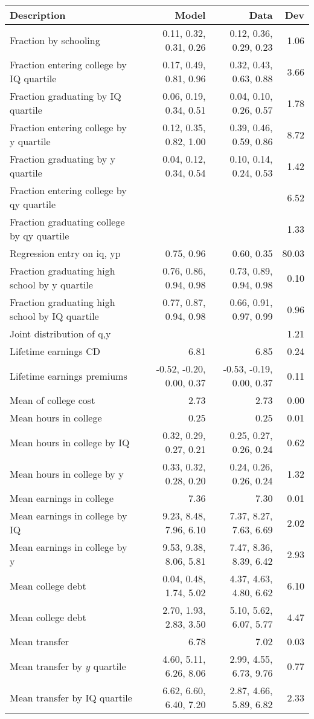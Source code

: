 \begin{tabular}{lrrr}
\hline
Description & Model  & Data  & Dev  \\ 
\hline
Fraction by schooling & 0.11, 0.32, 0.31, 0.26  & 0.12, 0.36, 0.29, 0.23  & 1.06  \\ 
Fraction entering college by IQ quartile & 0.17, 0.49, 0.81, 0.96  & 0.32, 0.43, 0.63, 0.88  & 3.66  \\ 
Fraction graduating by IQ quartile & 0.06, 0.19, 0.34, 0.51  & 0.04, 0.10, 0.26, 0.57  & 1.78  \\ 
Fraction entering college by y quartile & 0.12, 0.35, 0.82, 1.00  & 0.39, 0.46, 0.59, 0.86  & 8.72  \\ 
Fraction graduating by y quartile & 0.04, 0.12, 0.34, 0.54  & 0.10, 0.14, 0.24, 0.53  & 1.42  \\ 
Fraction entering college by qy quartile &   &   & 6.52  \\ 
Fraction graduating college by qy quartile &   &   & 1.33  \\ 
Regression entry on iq, yp & 0.75, 0.96  & 0.60, 0.35  & 80.03  \\ 
Fraction graduating high school by y quartile & 0.76, 0.86, 0.94, 0.98  & 0.73, 0.89, 0.94, 0.98  & 0.10  \\ 
Fraction graduating high school by IQ quartile & 0.77, 0.87, 0.94, 0.98  & 0.66, 0.91, 0.97, 0.99  & 0.96  \\ 
Joint distribution of q,y &   &   & 1.21  \\ 
Lifetime earnings CD & 6.81  & 6.85  & 0.24  \\ 
Lifetime earnings premiums & -0.52, -0.20, 0.00, 0.37  & -0.53, -0.19, 0.00, 0.37  & 0.11  \\ 
Mean of college cost & 2.73  & 2.73  & 0.00  \\ 
Mean hours in college & 0.25  & 0.25  & 0.01  \\ 
Mean hours in college by IQ & 0.32, 0.29, 0.27, 0.21  & 0.25, 0.27, 0.26, 0.24  & 0.62  \\ 
Mean hours in college by y & 0.33, 0.32, 0.28, 0.20  & 0.24, 0.26, 0.26, 0.24  & 1.32  \\ 
Mean earnings in college & 7.36  & 7.30  & 0.01  \\ 
Mean earnings in college by IQ & 9.23, 8.48, 7.96, 6.10  & 7.37, 8.27, 7.63, 6.69  & 2.02  \\ 
Mean earnings in college by y & 9.53, 9.38, 8.06, 5.81  & 7.47, 8.36, 8.39, 6.42  & 2.93  \\ 
Mean college debt & 0.04, 0.48, 1.74, 5.02  & 4.37, 4.63, 4.80, 6.62  & 6.10  \\ 
Mean college debt & 2.70, 1.93, 2.83, 3.50  & 5.10, 5.62, 6.07, 5.77  & 4.47  \\ 
Mean transfer & 6.78  & 7.02  & 0.03  \\ 
Mean transfer by $y$ quartile & 4.60, 5.11, 6.26, 8.06  & 2.99, 4.55, 6.73, 9.76  & 0.77  \\ 
Mean transfer by IQ quartile & 6.62, 6.60, 6.40, 7.20  & 2.87, 4.66, 5.89, 6.82  & 2.33  \\ 
\hline
\end{tabular}%
